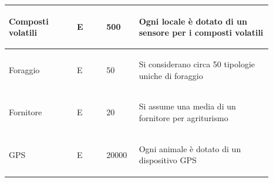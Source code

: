 \documentclass[12pt,a4paper]{article}
\begin{document}
\begin{center}
\begin{longtable}{|p{0.23\linewidth}|p{0.1\linewidth}|p{0.11\linewidth}|p{0.45\linewidth}|}
\hline
Composti volatili 				& \begin{center}
\vspace{-25pt}E
\end{center}
					& \begin{center}
					\vspace{-25pt}500\end{center}
					& \begin{flushleft}\vspace{-25pt} Ogni locale è dotato di un sensore per i composti volatili \end{flushleft}\\ 

\hline
Foraggio 				& \begin{center}
\vspace{-25pt}E
\end{center}
					& \begin{center}
					\vspace{-25pt}50\end{center}
					& \begin{flushleft}\vspace{-25pt} Si considerano circa 50 tipologie uniche di foraggio \end{flushleft}\\ 

\hline
Fornitore 				& \begin{center}
\vspace{-25pt}E
\end{center}
					& \begin{center}
					\vspace{-25pt}20\end{center}
					& \begin{flushleft}\vspace{-25pt} Si assume una media di un fornitore per agriturismo \end{flushleft}\\ 

\hline
GPS 				& \begin{center}
\vspace{-25pt}E
\end{center}
					& \begin{center}
					\vspace{-25pt}20000\end{center}
					& \begin{flushleft}\vspace{-25pt} Ogni animale è dotato di un dispositivo GPS \end{flushleft}\\ 


\end{longtable}
\end{center}
\end{document}
